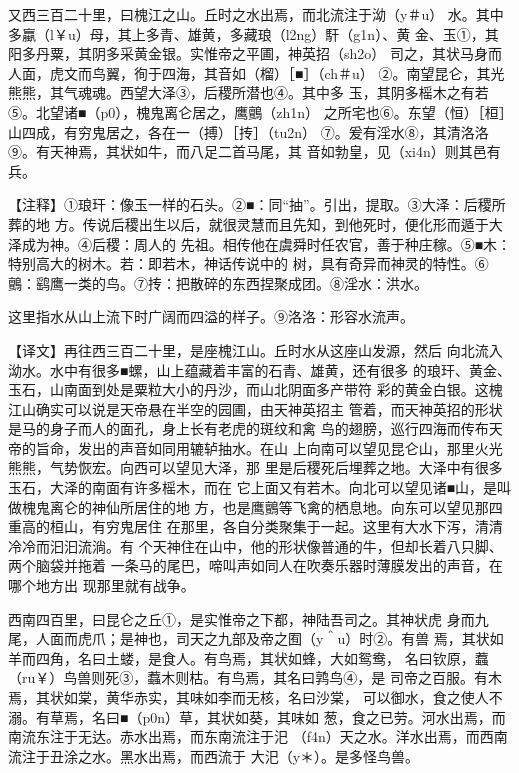\documentclass[a4paper,12pt,UTF8,twoside]{ctexbook}
\begin{document}
又西三百二十里，曰槐江之山。丘时之水出焉，而北流注于泑（y＃u） 水。其中多蠃（l￥u）母，其上多青、雄黄，多藏琅（l2ng）馯（g1n）、黄 金、玉①，其阳多丹粟，其阴多采黄金银。实惟帝之平圃，神英招（sh2o） 司之，其状马身而人面，虎文而鸟翼，徇于四海，其音如（榴）［■］（ch＃u） ②。南望昆仑，其光熊熊，其气魂魂。西望大泽③，后稷所潜也④。其中多 玉，其阴多榣木之有若⑤。北望诸■（p0），槐鬼离仑居之，鹰鸇（zh1n） 之所宅也⑥。东望（恒）［桓］山四成，有穷鬼居之，各在一（搏）［抟］（tu2n） ⑦。爰有淫水⑧，其清洛洛⑨。有天神焉，其状如牛，而八足二首马尾，其 音如勃皇，见（xi4n）则其邑有兵。

【注释】①琅玕：像玉一样的石头。②■：同“抽”。引出，提取。③大泽：后稷所葬的地 方。传说后稷出生以后，就很灵慧而且先知，到他死时，便化形而遁于大泽成为神。④后稷：周人的 先祖。相传他在虞舜时任农官，善于种庄稼。⑤■木：特别高大的树木。若：即若木，神话传说中的 树，具有奇异而神灵的特性。⑥鸇：鹞鹰一类的鸟。⑦抟：把散碎的东西捏聚成团。⑧淫水：洪水。

这里指水从山上流下时广阔而四溢的样子。⑨洛洛：形容水流声。

【译文】再往西三百二十里，是座槐江山。丘时水从这座山发源，然后 向北流入泑水。水中有很多■螺，山上蕴藏着丰富的石青、雄黄，还有很多 的琅玕、黄金、玉石，山南面到处是粟粒大小的丹沙，而山北阴面多产带符 彩的黄金白银。这槐江山确实可以说是天帝悬在半空的园圃，由天神英招主 管着，而天神英招的形状是马的身子而人的面孔，身上长有老虎的斑纹和禽 鸟的翅膀，巡行四海而传布天帝的旨命，发出的声音如同用辘轳抽水。在山 上向南可以望见昆仑山，那里火光熊熊，气势恢宏。向西可以望见大泽，那 里是后稷死后埋葬之地。大泽中有很多玉石，大泽的南面有许多榣木，而在 它上面又有若木。向北可以望见诸■山，是叫做槐鬼离仑的神仙所居住的地 方，也是鹰鸇等飞禽的栖息地。向东可以望见那四重高的桓山，有穷鬼居住 在那里，各自分类聚集于一起。这里有大水下泻，清清冷冷而汩汩流淌。有 个天神住在山中，他的形状像普通的牛，但却长着八只脚、两个脑袋并拖着 一条马的尾巴，啼叫声如同人在吹奏乐器时薄膜发出的声音，在哪个地方出 现那里就有战争。

西南四百里，曰昆仑之丘①，是实惟帝之下都，神陆吾司之。其神状虎 身而九尾，人面而虎爪；是神也，司天之九部及帝之囿（y＾u）时②。有兽 焉，其状如羊而四角，名曰土蝼，是食人。有鸟焉，其状如蜂，大如鸳鸯， 名曰钦原，蠚（ru￥）鸟兽则死③，蠚木则枯。有鸟焉，其名曰鹑鸟④，是 司帝之百服。有木焉，其状如棠，黄华赤实，其味如李而无核，名曰沙棠， 可以御水，食之使人不溺。有草焉，名曰■（p0n）草，其状如葵，其味如 葱，食之已劳。河水出焉，而南流东注于无达。赤水出焉，而东南流注于汜 （f4n）天之水。洋水出焉，而西南流注于丑涂之水。黑水出焉，而西流于 大汜（y＊）。是多怪鸟兽。
\end{document}
